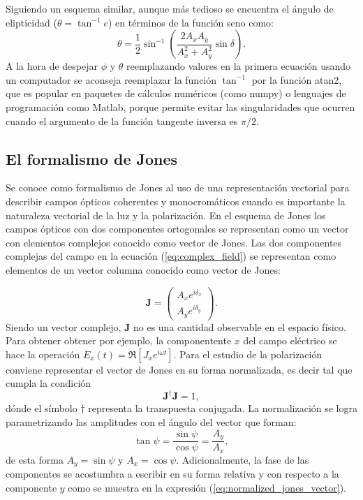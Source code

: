 Siguiendo un esquema similar, aunque más tedioso se encuentra el
ángulo de elipticidad ($\theta = \tan^{-1}{e}$) en términos de la
función seno como:
\begin{equation*}
\theta = \frac{1}{2}\sin^{-1}{\left(\frac{2A_xA_y}{A_x^2+A_y^2}\sin{\delta}\right)}.
\end{equation*}
A la hora de despejar $\phi$ y $\theta$ reemplazando valores en la
primera ecuación usando un computador se aconseja reemplazar la función
$\tan^{-1}$ por la función atan2, que es popular en paquetes de
cálculos numéricos (como numpy) o lenguajes de programación como
Matlab, porque permite evitar las singularidades que ocurren cuando el argumento de la
función tangente inversa es $\pi/2$.

\subsection{El formalismo de Jones}

Se conoce como formalismo de Jones al uso de una representación
vectorial para describir campos ópticos coherentes y monocromáticos cuando es
importante la naturaleza vectorial de la luz y la polarización.  
En el esquema de Jones los campos ópticos con dos componentes ortogonales se
representan como un vector con elementos complejos conocido como
vector de Jones. Las dos componentes complejas del campo en la ecuación
(\ref{eq:complex_field}) se representan como elementos de un vector
columna conocido como vector de Jones:
 
\begin{equation}
\mathbf{J} =\begin{pmatrix} A_xe^{i\delta_x}\\A_ye^{i\delta_y}\end{pmatrix}.
\label{eq:jones_vector}
\end{equation}
Siendo un vector complejo, $\mathbf{J}$ no es una cantidad observable
en el espacio físico. Para obtener obtener por ejemplo, la
componentente  $x$ del campo eléctrico se hace la operación $E_x(t) = \Re
\left[J_xe^{i\omega t}\right]$.
Para el estudio de la polarización conviene representar el vector de
Jones en su forma normalizada, es decir tal que cumpla la
condición $$\mathbf{J}^{\dagger}\mathbf{J}=1,$$
dónde el símbolo $\dagger$ representa la transpuesta conjugada.
La normalización se logra parametrizando las amplitudes con el ángulo
del vector que forman: $$\tan{\psi}=\frac{\sin{\psi}}{\cos{\psi}}=\frac{A_y}{A_x},$$
de esta forma $A_y=\sin{\psi}$ y $A_x = \cos{\psi}$. Adicionalmente,
la fase de las componentes se acostumbra a escribir en su forma
relativa y con respecto a la componente $y$ como se muestra en la
expresión (\ref{eq:normalized_jones_vector}).

